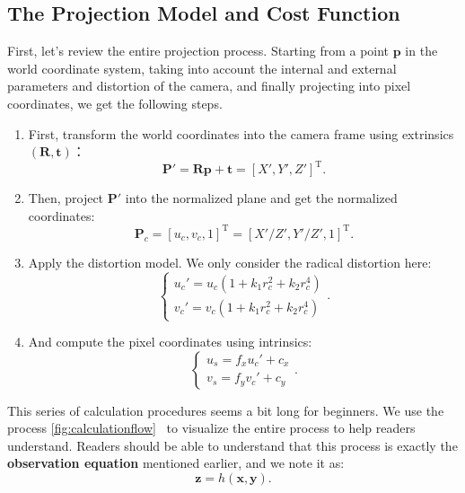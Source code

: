 \subsection{The Projection Model and Cost Function}
First, let's review the entire projection process. Starting from a point $\mathbf{p}$ in the world coordinate system, taking into account the internal and external parameters and distortion of the camera, and finally projecting into pixel coordinates, we get the following steps.

\begin{enumerate}
	\item First, transform the world coordinates into the camera frame using extrinsics $(\mathbf{R}, \mathbf{t})$：
	\begin{equation}
		\mathbf{P}' = \mathbf{R} \mathbf{p} + \mathbf{t} = [X', Y', Z']^\mathrm{T}.
	\end{equation}
	\item Then, project $\mathbf{P}'$ into the normalized plane and get the normalized coordinates: 
	\begin{equation}
		\mathbf{P}_c = [u_c, v_c, 1]^\mathrm{T} = [X'/Z', Y'/Z', 1]^\mathrm{T}.
	\end{equation}
	\item Apply the distortion model. We only consider the radical distortion here: 
	\begin{equation}
		\left\{
		\begin{array}{l}
			u_c' = {u_c}\left( {1 + {k_1}r_c^2 + {k_2}r_c^4} \right)\\
			v_c' = {v_c}\left( {1 + {k_1}r_c^2 + {k_2}r_c^4} \right)
		\end{array}
		\right. .
	\end{equation}
	\item And compute the pixel coordinates using intrinsics:
	\begin{equation}
		\left\{ \begin{array}{l}
			{u_s} = {f_x}u_c' + {c_x}\\
			{v_s} = {f_y}v_c' + {c_y} 
		\end{array} \right. .
	\end{equation}
\end{enumerate}

This series of calculation procedures seems a bit long for beginners. We use the process \autoref{fig:calculationflow}~ to visualize the entire process to help readers understand. Readers should be able to understand that this process is exactly the \textbf{observation equation} mentioned earlier, and we note it as:
\begin{equation}
	\mathbf{z} = h(\mathbf{x}, \mathbf{y}).
\end{equation}


